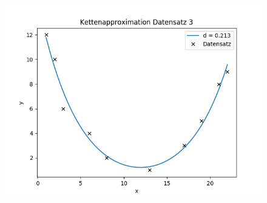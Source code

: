 \documentclass[a4paper, 11pt]{beamer}
\begin{document}
\begin{frame}
\begin{figure}
\begin{minipage}{.4\textwidth}
            \includegraphics[scale=0.31]{kettenapproximation_ds3}
        \end{minipage}
    \end{figure}
\end{frame}
\end{document}
